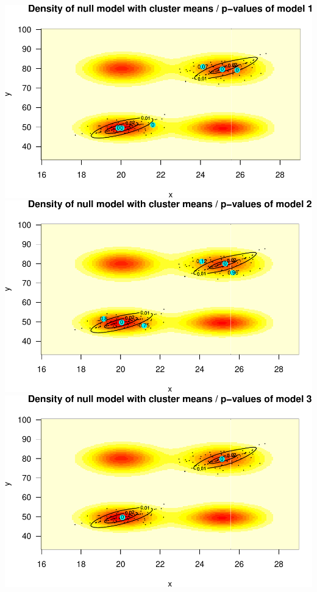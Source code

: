 \documentclass[]{article}
\begin{document}
\includegraphics{mclust_sim_files/figure-latex/unnamed-chunk-5-1.pdf}
\includegraphics{mclust_sim_files/figure-latex/unnamed-chunk-5-2.pdf}
\includegraphics{mclust_sim_files/figure-latex/unnamed-chunk-5-3.pdf}
\end{document}
